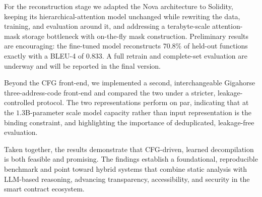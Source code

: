 \documentclass{article}
\begin{document}
For the reconstruction stage we adapted the Nova architecture to Solidity, keeping
its hierarchical-attention model unchanged while rewriting the data, training, and
evaluation around it, and addressing a terabyte-scale attention-mask storage
bottleneck with on-the-fly mask construction. Preliminary results are encouraging:
the fine-tuned model reconstructs $70.8\%$ of held-out functions exactly with a
BLEU-4 of $0.833$. A full retrain and complete-set evaluation are underway and will
be reported in the final version.

Beyond the CFG front-end, we implemented a second, interchangeable Gigahorse
three-address-code front-end and compared the two under a stricter,
leakage-controlled protocol. The two representations perform on par, indicating
that at the $1.3$B-parameter scale model capacity rather than input representation
is the binding constraint, and highlighting the importance of deduplicated,
leakage-free evaluation.

Taken together, the results demonstrate that CFG-driven, learned decompilation is
both feasible and promising. The findings establish a foundational, reproducible
benchmark and point toward hybrid systems that combine static analysis with
LLM-based reasoning, advancing transparency, accessibility, and security in the
smart contract ecosystem.


\end{document}

